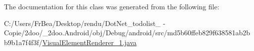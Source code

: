 The documentation for this class was generated from the following file:\begin{CompactItemize}
\item 
C:/Users/FrBea/Desktop/rendu/DotNet\_\-todolist\_ - Copie/2doo/\_\-2doo.Android/obj/Debug/android/src/md5b60ffeb829f638581ab2bb9b1a7f4f3f/\hyperlink{_visual_element_renderer__1_8java}{VisualElementRenderer\_\-1.java}\end{CompactItemize}
